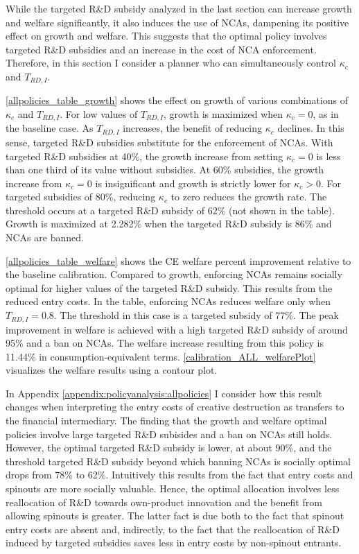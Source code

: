 \documentclass[11pt,english]{article}
\theoremstyle{definition}
\begin{document}
While the targeted R\&D subsidy analyzed in the last section can increase growth and welfare significantly, it also induces the use of NCAs, dampening its positive effect on growth and welfare. This suggests that the optimal policy involves targeted R\&D subsidies and an increase in the cost of NCA enforcement. Therefore, in this section I consider a planner who can simultaneously control $\kappa_c$ and $T_{RD,I}$. 

\autoref{allpolicies_table_growth} shows the effect on growth of various combinations of $\kappa_c$ and $T_{RD,I}$. For low values of $T_{RD,I}$, growth is maximized when $\kappa_c = 0$, as in the baseline case. As $T_{RD,I}$ increases, the benefit of reducing $\kappa_c$ declines. In this sense, targeted R\&D subsidies substitute for the enforcement of NCAs. With targeted R\&D subsidies at 40\%, the growth increase from setting $\kappa_c = 0$ is less than one third of its value without subsidies. At 60\% subsidies, the growth increase from $\kappa_c = 0$ is insignificant and growth is strictly lower for $\kappa_c > 0$. For targeted subsidies of 80\%, reducing $\kappa_c$ to zero reduces the growth rate. The threshold occurs at a targeted R\&D subsidy of 62\% (not shown in the table). Growth is maximized at 2.282\% when the targeted R\&D subsidy is 86\% and NCAs are banned.

\autoref{allpolicies_table_welfare} shows the CE welfare percent improvement relative to the baseline calibration. Compared to growth, enforcing NCAs remains socially optimal for higher values of the targeted R\&D subsidy. This results from the reduced entry costs. In the table, enforcing NCAs reduces welfare only when $T_{RD,I} = 0.8$. The threshold in this case is a targeted subsidy of 77\%. The peak improvement in welfare is achieved with a high targeted R\&D subsidy of around 95\% and a ban on NCAs. The welfare increase resulting from this policy is 11.44\% in consumption-equivalent terms. \autoref{calibration_ALL_welfarePlot} visualizes the welfare results using a contour plot. 

In Appendix \ref{appendix:policyanalysis:allpolicies} I consider how this result changes when interpreting the entry costs of creative destruction as transfers to the financial intermediary. The finding that the growth and welfare optimal policies involve large targeted R\&D subisides and a ban on NCAs still holds. However, the optimal targeted R\&D subsidy is lower, at about 90\%, and the threshold targeted R\&D subsidy beyond which banning NCAs is socially optimal drops from 78\% to 62\%. Intuitively this results from the fact that entry costs and spinouts are more socially valuable. Hence, the optimal allocation involves less reallocation of R\&D towards own-product innovation and the benefit from allowing spinouts is greater. The latter fact is due both to the fact that spinout entry costs are absent and, indirectly, to the fact that the reallocation of R\&D induced by targeted subsidies saves less in entry costs by non-spinout entrants.
\end{document}
